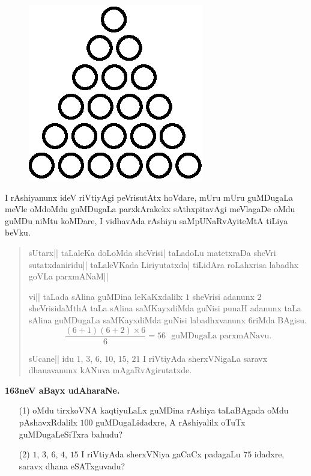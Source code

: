 \begin{figure}[H]
\centering
\includegraphics{figure/fig41.eps}
\end{figure}

I rAshiyanunx ideV riVtiyAgi peVrisutAtx hoVdare, mUru mUru guMDugaLa
meVle oMdoMdu guMDugaLa parxkArakekx sAthxpitavAgi meVlagaDe oMdu
guMDu niMtu koMDare, I vidhavAda rAshiyu saMpUNaRvAyiteMtA tiLiya
beVku.

\begin{verse}
sUtarx|| taLaleKa doLoMda sheVrisi| taLadoLu matetxraDa sheVri
sutatxdaniridu|| taLaleVKada Liriyutatxda| tiLidAra roLahxrisa labadhx
goVLa parxmANaM||

vi|| taLada sAlina guMDina leKaKxdalilx $1$ sheVrisi adanunx $2$
sheVrisidaMthA taLa sAlina saMKayxdiMda guNisi punaH adanunx taLa
sAlina guMDugaLa saMKayxdiMda guNisi labadhxvanunx $6$riMda BAgisu.
$$
\frac{(6+1)(6+2)\times 6}{6}=56\text{~ guMDugaLa parxmANavu.}
$$

sUcane|| idu $1$, $3$, $6$, $10$, $15$, $21$ I riVtiyAda sherxVNigaLa
saravx dhanavanunx kANuva mAgaRvAgirutatxde.
\end{verse}

\medskip
\begin{center}
{\large\bf 163neV aBayx udAharaNe.}
\end{center}

\begin{itemize}
\item[\rm(1)] oMdu tirxkoVNA kaqtiyuLaLx guMDina rAshiya taLaBAgada
oMdu pAshavxRdalilx $100$ guMDugaLidadxre, A rAshiyalilx oTuTx
guMDugaLeSiTxra bahudu?

\item[\rm(2)] $1$, $3$, $6$, $4$, $15$ I riVtiyAda sherxVNiya gaCaCx
padagaLu $75$ idadxre, saravx dhana eSATxguvadu?
\end{itemize}


